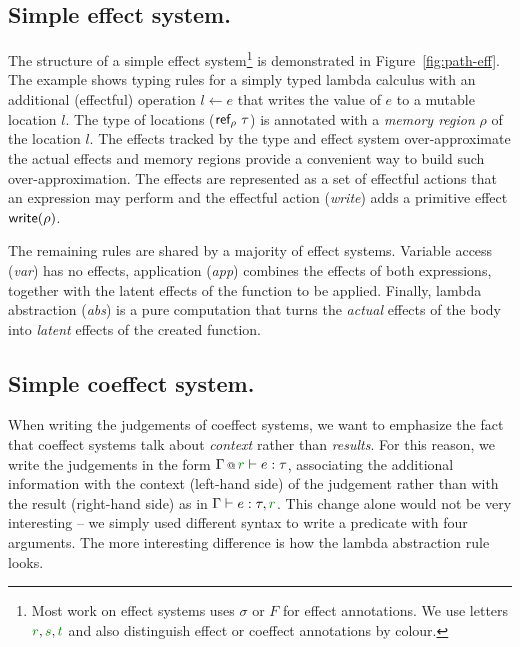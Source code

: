 
\subsection{Simple effect system.}
The structure of a simple effect system\footnote{Most work on effect systems uses $\sigma$ or $F$ for
effect annotations. We use letters $\cclrd{r}, \cclrd{s}, \cclrd{t}$ and also distinguish effect
or coeffect annotations by colour.} is demonstrated in Figure~\ref{fig:path-eff}. The example
shows typing rules for a simply typed lambda calculus with an additional (effectful) operation
$l \leftarrow e$ that writes the value of $e$ to a mutable location $l$. The type of locations
($\textnormal{\sffamily ref}_\rho~\tau$) is annotated with a \emph{memory region} $\rho$ of the location $l$.
The effects tracked by the type and effect system over-approximate the actual effects and memory
regions provide a convenient way to build such over-approximation. The effects are
represented as a set of effectful actions that an expression may perform and the effectful action
(\emph{write}) adds a primitive effect $\textnormal{\sffamily write}(\rho)$.

The remaining rules are shared by a majority of effect systems. Variable access (\emph{var})
has no effects, application (\emph{app}) combines the effects of both expressions, together with
the latent effects of the function to be applied. Finally, lambda abstraction (\emph{abs}) is a
pure computation that turns the \emph{actual} effects of the body into \emph{latent} effects of
the created function.


\subsection{Simple coeffect system.}
\label{sec:path-effects-coeff}

When writing the judgements of coeffect systems, we want to emphasize the fact that coeffect
systems talk about \emph{context} rather than \emph{results}. For this reason, we write the
judgements in the form $\coctx{\Gamma}{\cclrd{r}} \vdash e : \tau$, associating the additional
information with the context (left-hand side) of the judgement rather than with the result
(right-hand side) as in $\Gamma \vdash e : \tau, \cclrd{r}$. This change alone would not be
very interesting -- we simply used different syntax to write a predicate with four arguments.
The more interesting difference is how the lambda abstraction rule looks.

